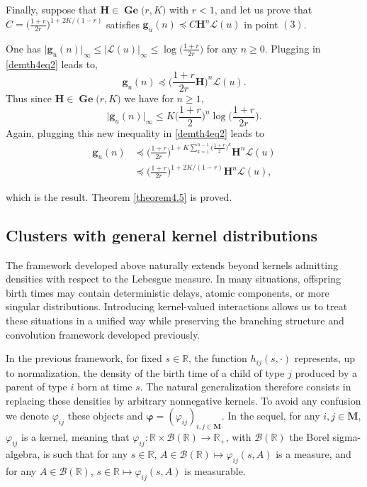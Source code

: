 \documentclass[reqno,final,11pt]{amsart}
\theoremstyle{plain}
\theoremstyle{definition}
\theoremstyle{remark}
\newcommand{\R}{\mathds{R}}
\newcommand{\M}{\bm{M}}
\newcommand{\Ge}[2]{\bm{\Gel(} #1,#2 \bm{)} }
\renewcommand{\L}{\bm{\mathscr{L}}}
\newcommand{\g}{\bm{g}}
\renewcommand{\H}{\bm{H}}
\DeclareMathOperator{\Gel}{Ge}
\begin{document}
Finally, suppose that $\H\in\Ge{r}{K}$ with $r<1$, and let us prove that $C = \Big(\frac{1+r}{2r}\Big)^{1+2K/(1-r)}$ satisfies $\g_u(n) \preceq C \H^n \L(u)$ in point $(3)$.

One has $\vert \g_{u}(n)\vert_{\infty} \leq \vert \L(u) \vert_{\infty} \leq \log\big(\frac{1+r}{2r}\big)$ for any $n\geq 0$. Plugging in \eqref{demth4eq2} leads to,
\begin{equation*}
    \g_{u}(n)  \preceq  \Big(\frac{1+r}{2r}\H\Big)^n \L(u).
\end{equation*}
Thus since $\H\in\Ge{r}{K}$ we have for $n\geq 1$,
\begin{equation*}
    \vert \g_{u}(n)\vert_{\infty} \leq K \Big(\frac{1+r}{2}\Big)^n \log\big(\frac{1+r}{2r}\big).
\end{equation*}
Again, plugging this new inequality in \eqref{demth4eq2} leads to
\begin{align*}
    \g_{u}(n) &  \preceq \Big(\frac{1+r}{2r}\Big)^{1+K\sum_{k=1}^{n-1} \big(\frac{1+r}{2}\big)^k}\H^n \L(u) \\
    & \preceq \Big(\frac{1+r}{2r}\Big)^{1+2K/(1-r)}\H^n \L(u),
\end{align*}

which is the result. Theorem \ref{theorem4.5} is proved.

\subsection{Clusters with general kernel distributions}

The framework developed above naturally extends beyond kernels admitting densities with respect to the Lebesgue measure. In many situations, offspring birth times may contain deterministic delays, atomic components, or more singular distributions. Introducing kernel-valued interactions allows us to treat these situations in a unified way while preserving the branching structure and convolution framework developed previously.

In the previous framework, for fixed $s\in\R$, the function $h_{ij}(s,\cdot)$ represents, up to normalization, the density of the birth time of a child of type $j$ produced by a parent of type $i$ born at time $s$. The natural generalization therefore consists in replacing these densities by arbitrary nonnegative kernels. To avoid any confusion we denote $\varphi_{ij}$ these objects and $\bm{\varphi} = (\varphi_{ij})_{i,j\in\M}$. In the sequel, for any $i,j\in\M$, $\varphi_{ij}$ is a kernel, meaning that $\varphi_{ij} : \R\times \mathcal{B}(\R) \longrightarrow \R_+$, with $\mathcal{B}(\R)$ the Borel sigma-algebra, is such that for any $s\in\R$, $A \in\mathcal{B}(\R) \mapsto \varphi_{ij}(s,A)$ is a measure, and for any $A\in \mathcal{B}(\R)$, $s \in\R \mapsto \varphi_{ij}(s,A)$ is measurable.
\end{document}
